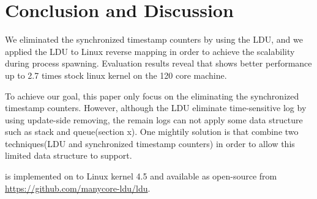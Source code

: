 \section{Conclusion and Discussion}
We eliminated the synchronized timestamp counters by using the LDU, and
we applied the LDU to Linux reverse mapping in order to achieve the scalability
during process spawning.
Evaluation results reveal that  shows better performance up to 2.7 times
stock linux kernel on the 120 core machine.

To achieve our goal, this paper only focus on the eliminating the synchronized
timestamp counters.
However, although the LDU eliminate time-sensitive log by using update-side
removing, the remain logs can not apply some data structure such as stack and
queue(section x).
One mightily solution is that combine two techniques(LDU and synchronized
timestamp counters) in order to allow this limited data structure to support.

 is implemented on to Linux kernel 4.5 and available as open-source
 from \url{https://github.com/manycore-ldu/ldu}.


